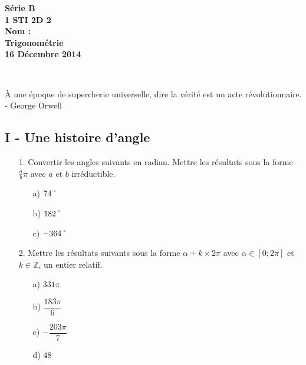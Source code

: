 \documentclass[12pt]{article}
\begin{document}

\begin{minipage}[t]{\textwidth}
  \raggedright
      {\bfseries Série B}\\[.35ex]
      {\bfseries 1 STI 2D 2}\\[.35ex]
      {\bfseries Nom : }\\[.35ex]
      \vspace*{-1cm}
      \raggedleft
          {\bfseries Trigonométrie}\\[.35ex]
          {\bfseries 16 Décembre 2014}\\[.35ex]
\end{minipage}\\[1em]

\begin{center}
  \textsf{À une époque de supercherie universelle, dire la vérité est un acte révolutionnaire. - George Orwell}\\
\end{center}

\setlength{\columnseprule}{0pt}

\subsection*{I - Une histoire d'angle}

\begin{enumerate}
\item[1.] Convertir les angles suivants en radian. Mettre les résultats sous la forme $\frac{a}{b}\pi$ avec $a$ et $b$ irréductible.

  \begin{multicols}{3}
    \begin{enumerate}
    \item[a)] $74\char23$
    \item[b)] $182\char23$
    \item[c)] $-364\char23$
    \end{enumerate}
  \end{multicols}

\item[2.] Mettre les résultats suivants sous la forme $\alpha + k\times 2\pi$ avec $\alpha \in [0 ; 2\pi]$ et $k \in \mathbb{Z}$, un entier relatif. 

  \begin{multicols}{4}
    \begin{enumerate}
    \item[a)] $331 \pi$
    \item[b)] $\dfrac{183 \pi}{6} $
    \item[c)] $- \dfrac{203 \pi}{7}$ 
    \item[d)] $48$
    \end{enumerate}
  \end{multicols}

\end{enumerate}
\end{document}
